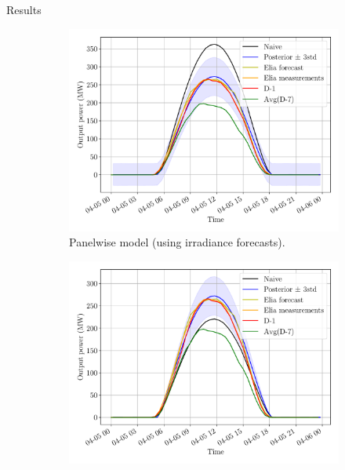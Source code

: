 \documentclass[12pt]{beamer}
\begin{document}
\begin{frame}{Results}
    \begin{figure}[H]
	\centering
	\begin{subfigure}{0.48\textwidth}
		\centering
		\includegraphics[width=\textwidth]{resources/pdf/solar_panelwise_START_FOR_05-04-2020.pdf}
		\caption{Panelwise model (using irradiance forecasts).}
	\end{subfigure}
	\hspace{0em}
	\begin{subfigure}{0.48\textwidth}
		\centering
		\includegraphics[width=\textwidth]{resources/pdf/solar_provincial_START_FOR_05-04-2020.pdf}
	\end{subfigure}
\end{figure}
\end{frame}
\end{document}
